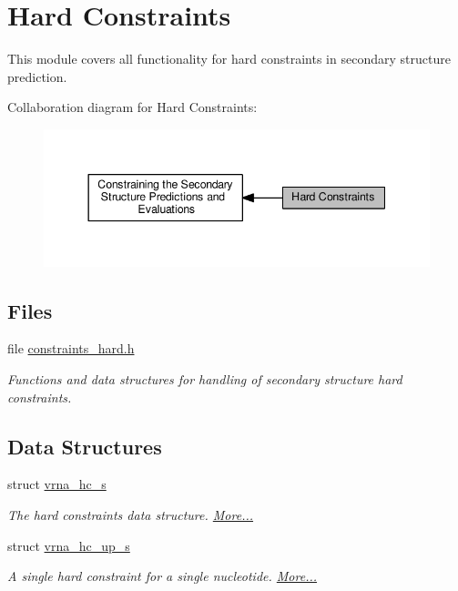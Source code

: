\hypertarget{group__hard__constraints}{}\section{Hard Constraints}
\label{group__hard__constraints}


This module covers all functionality for hard constraints in secondary structure prediction.  


Collaboration diagram for Hard Constraints\+:
\nopagebreak
\begin{figure}[H]
\begin{center}
\leavevmode
\includegraphics[width=344pt]{group__hard__constraints}
\end{center}
\end{figure}
\subsection*{Files}
\begin{DoxyCompactItemize}
\item 
file \hyperlink{constraints__hard_8h}{constraints\+\_\+hard.\+h}
\begin{DoxyCompactList}\small\item\em Functions and data structures for handling of secondary structure hard constraints. \end{DoxyCompactList}\end{DoxyCompactItemize}
\subsection*{Data Structures}
\begin{DoxyCompactItemize}
\item 
struct \hyperlink{group__hard__constraints_structvrna__hc__s}{vrna\+\_\+hc\+\_\+s}
\begin{DoxyCompactList}\small\item\em The hard constraints data structure.  \hyperlink{group__hard__constraints_structvrna__hc__s}{More...}\end{DoxyCompactList}\item 
struct \hyperlink{group__hard__constraints_structvrna__hc__up__s}{vrna\+\_\+hc\+\_\+up\+\_\+s}
\begin{DoxyCompactList}\small\item\em A single hard constraint for a single nucleotide.  \hyperlink{group__hard__constraints_structvrna__hc__up__s}{More...}\end{DoxyCompactList}\end{DoxyCompactItemize}
